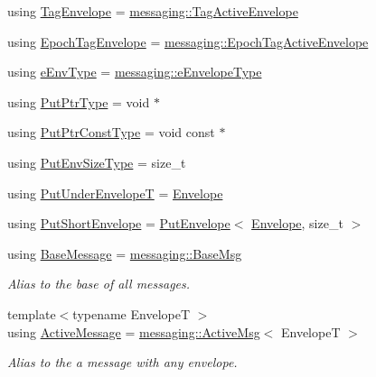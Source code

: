 \begin{DoxyCompactItemize}
\item 
using \hyperlink{namespacevt_a7b951ab92dca9319e12e3fc406ccb309}{Tag\+Envelope} = \hyperlink{structvt_1_1messaging_1_1_tag_active_envelope}{messaging\+::\+Tag\+Active\+Envelope}
\item 
using \hyperlink{namespacevt_af23b58014ced6898422213a0e5e6a27a}{Epoch\+Tag\+Envelope} = \hyperlink{structvt_1_1messaging_1_1_epoch_tag_active_envelope}{messaging\+::\+Epoch\+Tag\+Active\+Envelope}
\item 
using \hyperlink{namespacevt_abdfe9ac50e3799705ee21853c1509bf6}{e\+Env\+Type} = \hyperlink{namespacevt_1_1messaging_a6508ef3a4701a2e6fd0bfe3edcc63a6c}{messaging\+::e\+Envelope\+Type}
\item 
using \hyperlink{namespacevt_a537693bfe0223c71eb52bdbd6ea2c741}{Put\+Ptr\+Type} = void $\ast$
\item 
using \hyperlink{namespacevt_a494d6c6dc5cdb9a8d61eaedfa2c4d4f3}{Put\+Ptr\+Const\+Type} = void const  $\ast$
\item 
using \hyperlink{namespacevt_aa241444e21c15238e185923792814fe4}{Put\+Env\+Size\+Type} = size\+\_\+t
\item 
using \hyperlink{namespacevt_a233c004b26ccd826ef10686169371e01}{Put\+Under\+EnvelopeT} = \hyperlink{namespacevt_aa9c8cc094b5361482021d63012987814}{Envelope}
\item 
using \hyperlink{namespacevt_a8d7a7de9e76bfea1600009a775b7298c}{Put\+Short\+Envelope} = \hyperlink{structvt_1_1_put_envelope}{Put\+Envelope}$<$ \hyperlink{namespacevt_aa9c8cc094b5361482021d63012987814}{Envelope}, size\+\_\+t $>$
\item 
using \hyperlink{namespacevt_ac34f95a5e2b8109b55bfba52b074443d}{Base\+Message} = \hyperlink{structvt_1_1messaging_1_1_base_msg}{messaging\+::\+Base\+Msg}
\begin{DoxyCompactList}\small\item\em Alias to the base of all messages. \end{DoxyCompactList}\item 
{\footnotesize template$<$typename EnvelopeT $>$ }\\using \hyperlink{namespacevt_a00eb67bd138395b6a4f744fab3fa0678}{Active\+Message} = \hyperlink{structvt_1_1messaging_1_1_active_msg}{messaging\+::\+Active\+Msg}$<$ EnvelopeT $>$
\begin{DoxyCompactList}\small\item\em Alias to the a message with any envelope. \end{DoxyCompactList}\item 

\end{DoxyCompactItemize}

